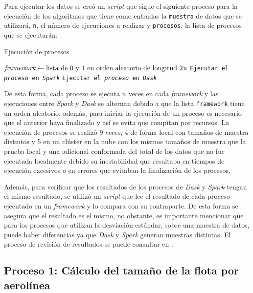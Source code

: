 Para ejecutar los datos se creó un \textit{script} que sigue el siguiente proceso para la ejecución de los algoritmos que tiene como entradas la \texttt{muestra} de datos que se utilizará, \texttt{n}, el número de ejecuciones a realizar y \texttt{procesos}, la lista de procesos que se ejecutarán:

\begin{algoritmo}[H]
\caption{Ejecución de procesos}\label{ejecucion_procesos}
\begin{algorithmic}[1]
	\State $\textit{framework} \gets \text{lista de 0 y 1 en orden aleatorio de longitud 2\textit{n}}$
		\State \texttt{Ejecutar el \textit{proceso} en \textit{Spark}}
		\Else
		\State \texttt{Ejecutar el \textit{proceso} en \textit{Dask}}
		\EndIf
	\EndFor
\EndFor
\EndProcedure
\end{algorithmic}
\end{algoritmo}

De esta forma, cada proceso se ejecuta $n$ veces en cada \textit{framework} y las ejecuciones entre \textit{Spark} y \textit{Dask} se alternan debido a que la lista \texttt{framework} tiene un orden aleatorio, además, para iniciar la ejecución de un proceso es necesario que el anterior haya finalizado y así se evita que compitan por recursos. La ejecución de procesos se realizó 9 veces, 4 de forma local con tamaños de muestra distintos y 5 en un clúster en la nube con los mismos tamaños de muestra que la prueba local y una adicional conformada del total de los datos que no fue ejecutada localmente debido su inestabilidad que resultaba en tiempos de ejecución excesivos o en errores que evitaban la finalización de los procesos.

Además, para verificar que los resultados de los procesos de \textit{Dask} y \textit{Spark} tengan el mismo resultado, se utilizó un \textit{script} que lee el resultado de cada proceso ejecutado en un \textit{framework} y lo compara con su contraparte. De esta forma se asegura que el resultado es el mismo, no obstante, es importante mencionar que para los procesos que utilizan la desviación estándar, sobre una muestra de datos, puede haber diferencias ya que \textit{Dask} y \textit{Spark} generan muestras distintas. El proceso de revisión de resultados se puede consultar en \cite{compara-resultados}.

\subsection{Proceso 1: Cálculo del tamaño de la flota por aerolínea}

